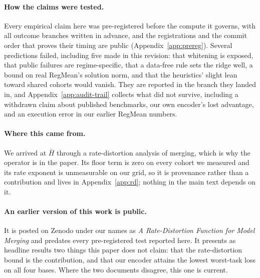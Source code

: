 \paragraph{How the claims were tested.} Every empirical claim here was
pre-registered before the compute it governs, with all outcome branches written
in advance, and the registrations and the commit order that proves their
timing are public (Appendix~\ref{app:prereg}). Several predictions failed,
including five made in this revision: that whitening is exposed, that public
failures are regime-specific, that a data-free rule sets the ridge well, a
bound on real RegMean's solution norm, and that the heuristics' slight lean
toward shared cohorts would vanish. They are reported in the branch they
landed in, and Appendix~\ref{app:audit-trail} collects what did not survive,
including a withdrawn claim about published benchmarks, our own encoder's lost
advantage, and an execution error in our earlier RegMean numbers.

\paragraph{Where this came from.} We arrived at $\bar H$ through a
rate-distortion analysis of merging, which is why the operator is in the paper.
Its floor term is zero on every cohort we measured and its rate exponent is
unmeasurable on our grid, so it is provenance rather than a contribution and
lives in Appendix~\ref{app:rd}; nothing in the main text depends on it.

\paragraph{An earlier version of this work is public.} It is posted on Zenodo
under our names as \emph{A Rate-Distortion Function for Model Merging}
\citep{pathak2026rd} and predates every pre-registered test reported here. It
presents as headline results two things this paper does not claim: that the
rate-distortion bound is the contribution, and that our encoder attains the
lowest worst-task loss on all four bases. Where the two documents disagree,
this one is current.


